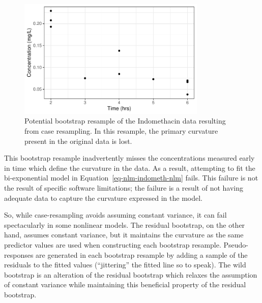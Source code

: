 \documentclass[
  letterpaper,
  DIV=11,
  numbers=noendperiod]{scrreprt}
\theoremstyle{definition}
\theoremstyle{definition}
\theoremstyle{remark}
\begin{document}
\begin{figure}

{\centering \includegraphics[width=0.8\textwidth,height=\textheight]{./images/fig-nlm-indomethacin-resample-plot-1.pdf}

}

\caption{\label{fig-nlm-indomethacin-resample-plot}Potential bootstrap
resample of the Indomethacin data resulting from case resampling. In
this resample, the primary curvature present in the original data is
lost.}

\end{figure}

This bootstrap resample inadvertently misses the concentrations measured
early in time which define the curvature in the data. As a result,
attempting to fit the bi-exponential model in
Equation~\ref{eq-nlm-indometh-nlm} fails. This failure is not the result
of specific software limitations; the failure is a result of not having
adequate data to capture the curvature expressed in the model.

So, while case-resampling avoids assuming constant variance, it can fail
spectacularly in some nonlinear models. The residual bootstrap, on the
other hand, assumes constant variance, but it maintains the curvature as
the same predictor values are used when constructing each bootstrap
resample. Pseudo-responses are generated in each bootstrap resample by
adding a sample of the residuals to the fitted values (``jittering'' the
fitted line so to speak). The wild bootstrap is an alteration of the
residual bootstrap which relaxes the assumption of constant variance
while maintaining this beneficial property of the residual bootstrap.
\end{document}
